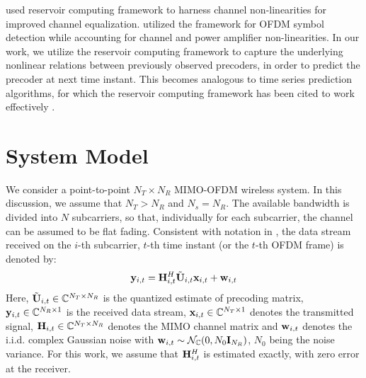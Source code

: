 \documentclass[conference]{IEEEtran}
\begin{document}
\cite{jaeger2004harnessing} used reservoir computing framework to harness channel non-linearities for improved channel equalization.
\cite{mosleh2017brain,shafin2018realizing} utilized the framework for OFDM symbol detection while accounting for channel and power amplifier non-linearities.
In our work, we utilize the reservoir computing framework to capture the underlying nonlinear relations between previously observed precoders, in order to predict the precoder at next time instant. This becomes analogous to time series prediction algorithms, for which the reservoir computing framework has been cited to work effectively \cite{mosleh2017brain}.

\section{System Model}
\label{section2}
We consider a point-to-point $N_T\times N_R$ MIMO-OFDM wireless system. 
In this discussion, we assume that $N_T > N_R$ and $N_s = N_R$.
The available bandwidth is divided into $N$ subcarriers, so that, individually for each subcarrier, the channel can be assumed to be flat fading.
Consistent with notation in \cite{6891198,Gupt1905:Predictive}, the data stream received on the $i$-th subcarrier, $t$-th time instant (or the $t$-th OFDM frame) is denoted by:
\begin{equation}
{\bf y}_{i,t}={\bf H}^{H}_{i,t}\tilde{{\bf U}}_{i,t}{\bf x}_{i,t}+ {\bf w}_{i,t}
\end{equation}
Here, $\tilde{{\bf U}}_{i,t} \in \mathbb{C}^{N_T \times N_R}$ is the quantized estimate of precoding matrix, ${\bf y}_{i,t} \in \mathbb{C}^{N_R \times 1}$ is the received data stream, ${\bf x}_{i,t} \in \mathbb{C}^{N_T \times 1}$ denotes the transmitted signal, ${\bf H}_{i,t} \in \mathbb{C}^{N_T \times N_R}$ denotes the MIMO channel matrix and ${\bf w}_{i,t}$ denotes the i.i.d. complex Gaussian noise with ${\bf w}_{i,t} \sim \mathcal{N}_{\mathbb{C}}(0,N_0{\bf I}_{N_R})$, $N_0$ being the noise variance. For this work, we assume that ${\bf H}^{H}_{i,t}$ is estimated exactly, with zero error at the receiver.

\end{document}
